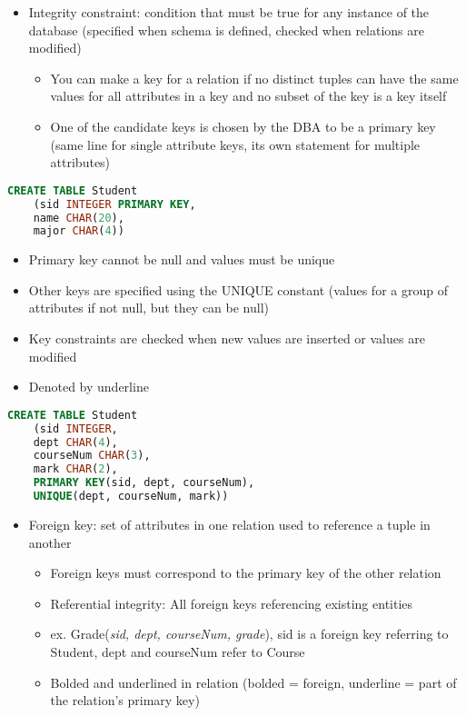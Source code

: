 \documentclass[8pt,landscape,a4paper, fleqn, dvipsnames]{extarticle}
\begin{document}
\begin{multicols*}{4}
\begin{itemize}
    \item Integrity constraint: condition that must be true for any instance of the database (specified when schema is defined, checked when relations are modified)
    \begin{itemize}
        \item You can make a key for a relation if no distinct tuples can have the same values for all attributes in a key and no subset of the key is a key itself
        \item One of the candidate keys is chosen by the DBA to be a primary key (same line for single attribute keys, its own statement for multiple attributes)
    \end{itemize}
\end{itemize}
\begin{lstlisting}[language = SQL]
CREATE TABLE Student
    (sid INTEGER PRIMARY KEY,
    name CHAR(20),
    major CHAR(4))
\end{lstlisting}
\begin{itemize}
    \item Primary key cannot be null and values must be unique
    \item Other keys are specified using the UNIQUE constant (values for a group of attributes if not null, but they can be null)
    \item Key constraints are checked when new values are inserted or values are modified
    \item Denoted by underline
\end{itemize}
\begin{lstlisting}[language = SQL]
CREATE TABLE Student
    (sid INTEGER,
    dept CHAR(4),
    courseNum CHAR(3),
    mark CHAR(2),
    PRIMARY KEY(sid, dept, courseNum),
    UNIQUE(dept, courseNum, mark))
\end{lstlisting}
\begin{itemize}
    \item Foreign key: set of attributes in one relation used to reference a tuple in another
    \begin{itemize}
        \item Foreign keys must correspond to the primary key of the other relation
        \item Referential integrity: All foreign keys referencing existing entities
        \item ex. Grade(\textit{sid, dept, courseNum, grade}), sid is a foreign key referring to Student, dept and courseNum refer to Course
        \item Bolded and underlined in relation (bolded = foreign, underline = part of the relation's primary key)

\end{itemize}
\end{itemize}
\end{multicols*}
\end{document}
